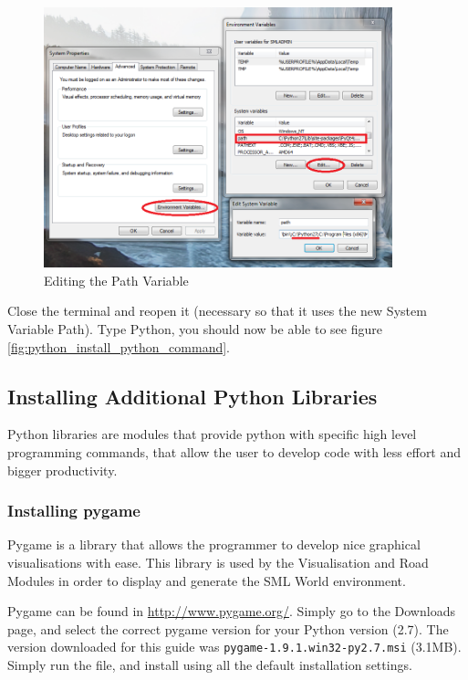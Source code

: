 \begin{figure}[h!]
  \centering
    \includegraphics[width=0.9\textwidth]{python_install_6_highlighted}
    \caption{Editing the Path Variable \label{fig:python_install_adding_to_the_path_variable} }
\end{figure}

Close the terminal and reopen it (necessary so that it uses the new System Variable Path). Type Python, you should now be able to see figure \ref{fig:python_install_python_command}.

\subsection{Installing Additional Python Libraries}
\label{subsec:installing_python_libraries}

Python libraries are modules that provide python with specific high level programming commands, that allow the user to develop code with less effort and bigger productivity.

\subsubsection{Installing pygame}

Pygame is a library that allows the programmer to develop nice graphical visualisations with ease. This library is used by the Visualisation and Road Modules in order to display and generate the SML World environment.

Pygame can be found in \url{http://www.pygame.org/}. Simply go to the Downloads page, and select the correct pygame version for your Python version (2.7).
The version downloaded for this guide was \texttt{pygame-1.9.1.win32-py2.7.msi} (3.1MB). Simply run the file, and install using all the default installation settings.

